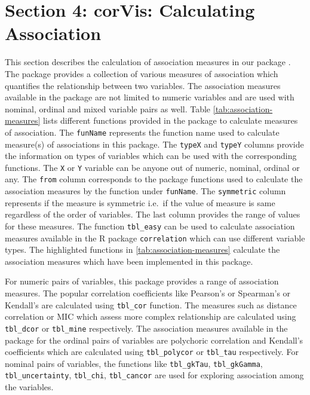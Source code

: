 \hypertarget{section-4-corvis-calculating-association}{%
\section{Section 4: corVis: Calculating
Association}\label{section-4-corvis-calculating-association}}

This section describes the calculation of association measures in our
package . The package provides a collection of various
measures of association which quantifies the relationship between two
variables. The association measures available in the package are not
limited to numeric variables and are used with nominal, ordinal and
mixed variable pairs as well. Table \ref{tab:association-measures} lists
different functions provided in the package to calculate measures of
association. The \texttt{funName} represents the function name used to
calculate measure(s) of associations in this package. The \texttt{typeX}
and \texttt{typeY} columns provide the information on types of variables
which can be used with the corresponding functions. The \texttt{X} or
\texttt{Y} variable can be anyone out of numeric, nominal, ordinal or
any. The \texttt{from} column corresponds to the package functions used
to calculate the association measures by the function under
\texttt{funName}. The \texttt{symmetric} column represents if the
measure is symmetric i.e.~if the value of measure is same regardless of
the order of variables. The last column provides the range of values for
these measures. The function \texttt{tbl\_easy} can be used to calculate
association measures available in the R package \texttt{correlation}
which can use different variable types. The highlighted functions in
\ref{tab:association-measures} calculate the association measures which
have been implemented in this package.

For numeric pairs of variables, this package provides a range of
association measures. The popular correlation coefficients like
Pearson's or Spearman's or Kendall's are calculated using
\texttt{tbl\_cor} function. The measures such as distance correlation or
MIC which assess more complex relationship are calculated using
\texttt{tbl\_dcor} or \texttt{tbl\_mine} respectively. The association
measures available in the package for the ordinal pairs of variables are
polychoric correlation and Kendall's coefficients which are calculated
using \texttt{tbl\_polycor} or \texttt{tbl\_tau} respectively. For
nominal pairs of variables, the functions like \texttt{tbl\_gkTau},
\texttt{tbl\_gkGamma}, \texttt{tbl\_uncertainty}, \texttt{tbl\_chi},
\texttt{tbl\_cancor} are used for exploring association among the
variables.

